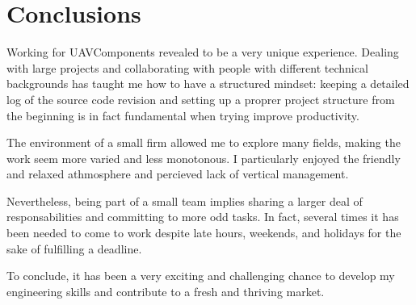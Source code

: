 \section{Conclusions}
Working for UAVComponents revealed to be a very unique experience.
Dealing with large projects and collaborating with people with different technical backgrounds has taught me how to have a structured mindset: keeping a detailed log of the source code revision and setting up a proprer project structure from the beginning is in fact fundamental when trying improve productivity.

The environment of a small firm allowed me to explore many fields, making the work seem more varied and less monotonous. 
I particularly enjoyed the friendly and relaxed athmosphere and percieved lack of vertical management.

Nevertheless, being part of a small team implies sharing a larger deal of responsabilities and committing to more odd tasks.
In fact, several times it has been needed to come to work despite late hours, weekends, and holidays for the sake of fulfilling a deadline.

To conclude, it has been a very exciting and challenging chance to develop my engineering skills and contribute to a fresh and thriving market.